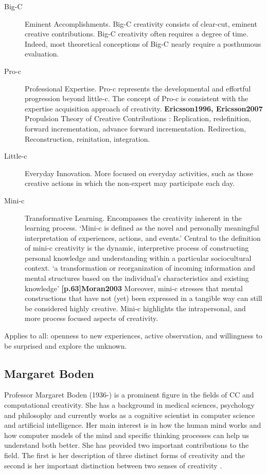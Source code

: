 \begin{description}
  \item [Big-C] Eminent Accomplishments. Big-C creativity consists of clear-cut, eminent creative contributions. Big-C creativity often requires a degree of time. Indeed, most theoretical conceptions of Big-C nearly require a posthumous evaluation.
  \item [Pro-c] Professional Expertise. Pro-c represents the developmental and effortful progression beyond little-c. The concept of Pro-c is consistent with the expertise acquisition approach of creativity. \textbf{Ericsson1996, Ericsson2007} Propulsion Theory of Creative Contributions \autocite{Sternberg1999, Sternberg2006}: Replication, redefinition, forward incrementation, advance forward incrementation. Redirection, Reconstruction, reinitation, integration.
  \item [Little-c] Everyday Innovation. More focused on everyday activities, such as those creative actions in which the non-expert may participate each day.
  \item [Mini-c] Transformative Learning. Encompasses the creativity inherent in the learning process. `Mini-c is defined as the novel and personally meaningful interpretation of experiences, actions, and events.' \autocite{Beghetto2007} Central to the definition of mini-c creativity is the dynamic, interpretive process of constructing personal knowledge and understanding within a particular sociocultural context. `a transformation or reorganization of incoming information and mental structures based on the individual\rq s characteristics and existing knowledge' \textbf{[p.63]Moran2003} Moreover, mini-c stresses that mental constructions that have not (yet) been expressed in a tangible way can still be considered highly creative. Mini-c highlights the intrapersonal, and more process focused aspects of creativity.
\end{description}

Applies to all: openness to new experiences, active observation, and willingness to be surprised and explore the unknown.


\subsection*{Margaret Boden}

Professor Margaret Boden (1936-) is a prominent figure in the fields of \ac{CC} and computational creativity. She has a background in medical sciences, psychology and philosophy and currently works as a cognitive scientist in computer science and artificial intelligence. Her main interest is in how the human mind works and how computer models of the mind and specific thinking processes can help us understand both better. She has provided two important contributions to the field. The first is her description of three distinct forms of creativity and the second is her important distinction between two senses of creativity \autocite{Boden2003}.

